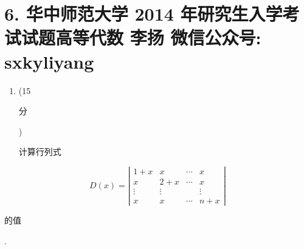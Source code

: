 \documentclass[10pt]{article}
\begin{document}
\section{6. 华中师范大学 2014 年研究生入学考试试题高等代数 
 李扬 
 微信公众号: sxkyliyang}
\begin{enumerate}
  \item (15 \begin{CJK}{UTF8}{mj}分\end{CJK}) \begin{CJK}{UTF8}{mj}计算行列式\end{CJK}
\end{enumerate}
$$
D(x)=\left|\begin{array}{cccc}
1+x & x & \cdots & x \\
x & 2+x & \cdots & x \\
\vdots & \vdots & & \vdots \\
x & x & \cdots & n+x
\end{array}\right|
$$
\begin{CJK}{UTF8}{mj}的值\end{CJK}.
\end{document}
